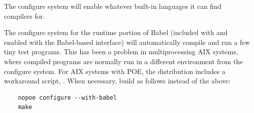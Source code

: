 The configure system will enable whatever built-in languages it can
find compilers for.

The configure system for the runtime portion of Babel (included with
\hypre{} and enabled with the Babel-based interface) will
automatically compile and run a few tiny test programs.  This has been
a problem in multiprocessing AIX systems, where compiled programs are
normally run in a different environment from the configure system.
For AIX systems with POE, the
\hypre{} distribution includes a workaround script, .
When necessary, build \hypre{} as follows instead of the above:

\begin{verbatim}
    nopoe configure --with-babel
    make
\end{verbatim}

